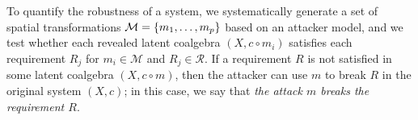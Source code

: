 {%



To quantify the robustness of a system, we systematically generate a set of spatial transformations $\mathcal{M}=\left\{m_1,\ldots, m_p\right\}$ based on an attacker model, and we test whether each revealed latent coalgebra $(X, c\circ m_i)$ satisfies each requirement $R_j$ for $m_i\in \mathcal{M}$ and $R_j\in \mathcal{R}$. If a requirement $R$ is not satisfied in some latent coalgebra $(X, c\circ m)$, then the attacker can use $m$ to break $R$ in the original system $(X,c)$; in this case, we say that \emph{the attack $m$ breaks the requirement $R$}. %

}
